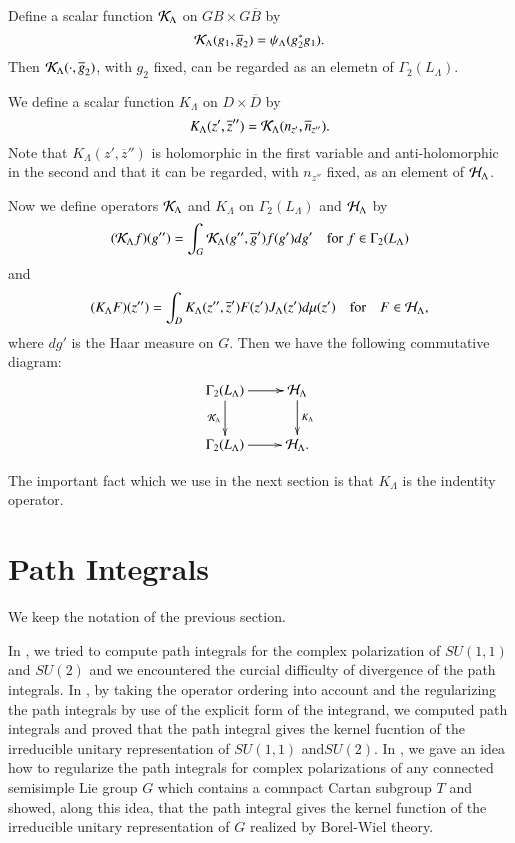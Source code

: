 Define a scalar function $\mathcal{K}_{\Lambda}$ on $ GB \times G\overline{B}$ by
$$
\mathcal{K}_{\Lambda}(g_{1}, \overline{g}_{2})= \psi_{\Lambda}(g_{2}^{*}g_{1}).
$$
Then $\mathcal{K}_{\Lambda}(\cdot, \overline{g}_{2})$, with $g_{2}$ fixed, can be regarded as an elemetn of $\Gamma_{2}(L_{\Lambda})$.

We define a scalar function $K_{\Lambda}$ on $D \times \overline{D}$ by
$$
K_{\Lambda}(z', \overline{z}'') = \mathcal{K}_{\Lambda}(n_{z'}, \overline{n}_{z''}).
$$
Note that $K_{\Lambda}(z', \overline{z}'')$ is holomorphic in the first variable and anti-holomor\-phic in the second and that it can be regarded, with $n_{z''}$ fixed, as an element of $\mathcal{H}_{\Lambda}$.

Now we define operators $\mathcal{K}_{\Lambda}$ and $K_{\Lambda}$ on $\Gamma_{2}(L_{\Lambda})$ and $\mathcal{H}_{\Lambda}$ by
$$
(\mathcal{K}_{\Lambda}f)(g'')= \int_{G}\mathcal{K}_{\Lambda}(g'', \overline{g}')f(g')dg' \quad \text{for}\; f\in \Gamma_{2}(L_{\Lambda})
$$
and
$$
(K_{\Lambda}F)(z'') = \int_{D}K_{\Lambda}(z'', \overline{z}')F(z')J_{\Lambda}(z')d\mu(z') \quad \text{for} \quad F\in \mathcal{H}_{\Lambda},
$$
where $dg'$ is the Haar measure on $G$. Then we have the following commutative diagram:
$$
\xymatrix{
\Gamma_{2}(L_{\Lambda})\ar[r]\ar[d]_-{\calK_{\Lambda}} &\calH_{\Lambda}\ar[d]^-{K_{\Lambda}}\\
\Gamma_{2}(L_{\Lambda})\ar[r] & \calH_{\Lambda}.
}
$$

The important fact which we use in the next section is that $K_{\Lambda}$ is the indentity operator.

\section{Path Integrals}\label{chap15-sec-3}
We keep the notation of the previous section.

In \cite{chap15-key5}, we tried to compute path integrals for the complex polarization of $SU(1,1)$ and $SU(2)$ and we encountered the curcial difficulty of divergence of the path integrals. In \cite{chap15-key6}, by taking the operator ordering into account and the regularizing the path integrals by use of the explicit form of the integrand, we computed path integrals and proved that the path integral gives the kernel fucntion of the irreducible unitary representation of $SU(1,1)$ and\pageoriginale $SU(2)$. In \cite{chap15-key7}, we gave an idea how to regularize the path integrals for complex polarizations of any connected semisimple Lie group $G$ which contains a comnpact Cartan subgroup $T$ and showed, along this idea, that the path integral gives the kernel function of the irreducible unitary representation of $G$ realized by Borel-Wiel theory.

